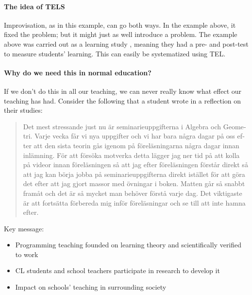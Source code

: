 \paragraph{The idea of \acs*{TELS}}

Improvisation, as in this example, can go both ways.
In the example above, it fixed the problem; but it might just as well introduce 
a problem.
The example above was carried out as a learning study 
\parencite{LearningStudy}, meaning they had a pre- and post-test to measure 
students' learning.
This can easily be systematized using \ac{TEL}.

\paragraph{Why do we need this in normal education?}

If we don't do this in all our teaching, we can never really know what effect 
our teaching has had.
Consider the following that a student wrote in a reflection on their studies:
\foreignblockquote{swedish}{Det mest stressande just nu är seminarieuppgifterna 
  i Algebra och Geometri.
  Varje vecka får vi nya uppgifter och vi har bara några dagar på oss efter att 
  den sista teorin gås igenom på föreläsningarna några dagar innan inlämning.
  För att försöka motverka detta lägger jag ner tid på att kolla på videor
  innan föreläsningen så att jag efter föreläsningen förstår direkt så att jag 
  kan börja jobba på seminarieuppgifterna direkt istället för att göra det 
  efter att jag gjort massor med övningar i boken.
  Matten går så snabbt framåt och det är så mycket man behöver förstå varje 
  dag.
  Det viktigaste är att fortsätta förbereda mig inför föreläsningar och se till 
att inte hamna efter.}


Key message:
\begin{itemize}
  \item Programming teaching founded on learning theory and scientifically 
    verified to work

  \item CL students and school teachers participate in research to develop it

  \item Impact on schools' teaching in surrounding society
\end{itemize}

